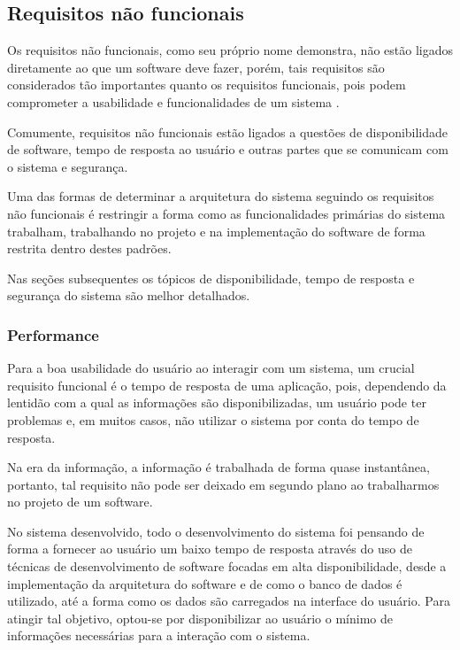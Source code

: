 \subsection{Requisitos não funcionais}

Os requisitos não funcionais, como seu próprio nome demonstra, não estão ligados diretamente ao que um software deve fazer, porém, tais requisitos são considerados tão importantes quanto os requisitos funcionais, pois podem comprometer a usabilidade e funcionalidades de um sistema \cite{engenharia_software_sommerville}.

Comumente, requisitos não funcionais estão ligados a questões de disponibilidade de software, tempo de resposta ao usuário e outras partes que se comunicam com o sistema e segurança.

Uma das formas de determinar a arquitetura do sistema seguindo os requisitos não funcionais é restringir a forma como as funcionalidades primárias do sistema trabalham, trabalhando no projeto e na implementação do software de forma restrita dentro destes padrões.

Nas seções subsequentes os tópicos de disponibilidade, tempo de resposta e segurança do sistema são melhor detalhados.

\subsubsection{Performance}

Para a boa usabilidade do usuário ao interagir com um sistema, um crucial requisito funcional é o tempo de resposta de uma aplicação, pois, dependendo da lentidão com a qual as informações são disponibilizadas, um usuário pode ter problemas e, em muitos casos, não utilizar o sistema por conta do tempo de resposta.

Na era da informação, a informação é trabalhada de forma quase instantânea, portanto, tal requisito não pode ser deixado em segundo plano ao trabalharmos no projeto de um software.

No sistema desenvolvido, todo o desenvolvimento do sistema foi pensando de forma a fornecer ao usuário um baixo tempo de resposta através do uso de técnicas de desenvolvimento de software focadas em alta disponibilidade, desde a implementação da arquitetura do software e de como o banco de dados é utilizado, até a forma como os dados são carregados na interface do usuário. Para atingir tal objetivo, optou-se por disponibilizar ao usuário o mínimo de informações necessárias para a interação com o sistema.


